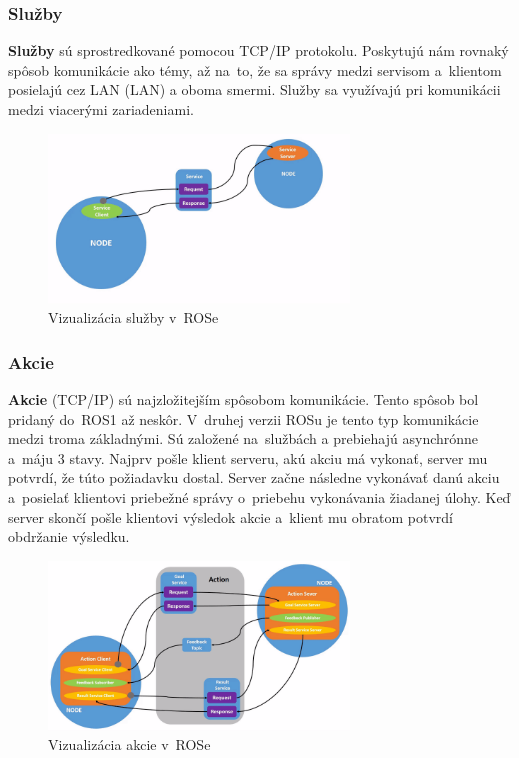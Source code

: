 \newpage
\subsubsection{Služby}

\textbf {Služby} sú sprostredkované pomocou TCP/IP protokolu. Poskytujú nám rovnaký spôsob komunikácie ako témy, až na~to, že sa správy
medzi servisom a~klientom posielajú cez LAN (\acrlong{LAN}) a oboma smermi. Služby sa využívajú pri komunikácii medzi viacerými zariadeniami.

\begin{figure}[h]
	\centering
	\includegraphics[width=8cm]{img/serviceExplanation.png}
	\caption{Vizualizácia služby v~ROSe~\cite{RosDoc}}
	\label{fig:service}
\end{figure}

\subsubsection{Akcie}

\label{s_action}
\textbf {Akcie} (TCP/IP) sú najzložitejším spôsobom komunikácie. Tento spôsob bol pridaný do~ROS1 až neskôr. V~druhej verzii ROSu je tento
typ komunikácie medzi troma základnými. Sú založené na~službách a prebiehajú asynchrónne~\cite{ROS2book} a~máju 3 stavy. Najprv pošle klient serveru,
akú akciu má vykonať, server mu potvrdí, že túto požiadavku dostal. Server začne následne vykonávať danú akciu a~posielať klientovi priebežné správy
o~priebehu vykonávania žiadanej úlohy. Keď server skončí pošle klientovi výsledok akcie a~klient mu obratom potvrdí obdržanie výsledku.

\begin{figure}[h]
	\centering
	\includegraphics[width=8cm]{img/actionExplanation.png}
	\caption{Vizualizácia akcie v~ROSe~\cite{RosDoc}}
	\label{fig:action}
\end{figure}

